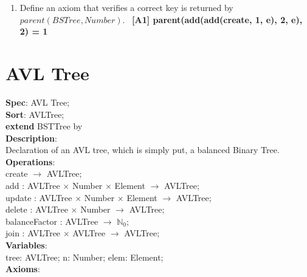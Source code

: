 \documentclass[12pt]{article}
\begin{document}
\begin{spacing}{1.5}
\begin{enumerate}
\item Define an axiom that verifies a correct key is returned by $parent(BSTree, Number)$.\
\hspace*{5mm} \textbf{[A1] parent(add(add(create, 1, e), 2, e), 2) = 1}
\

\end{enumerate}

\newpage

\section*{AVL Tree}

\noindent \textbf{Spec}: AVL Tree;\\
\noindent \textbf{Sort}: AVLTree;\\
\noindent \textbf{extend} BSTTree by\\
\noindent \textbf{Description}:\\Declaration of an AVL tree, which is simply put, a balanced Binary Tree.\\
\noindent \textbf{Operations}:\\
\hspace*{5mm} create $\rightarrow$ AVLTree;\\
\hspace*{5mm} add : AVLTree $\times$ Number $\times$ Element $\rightarrow$ AVLTree;\\
\hspace*{5mm} update : AVLTree $\times$ Number $\times$ Element $\rightarrow$ AVLTree;\\
\hspace*{5mm} delete : AVLTree $\times$ Number $\rightarrow$ AVLTree;\\
\hspace*{5mm} balanceFactor :  AVLTree $\rightarrow$ $\mathbb{N}_0$;\\
\hspace*{5mm} join : AVLTree $\times$ AVLTree $\rightarrow$ AVLTree;\\
\noindent \textbf{Variables}:\\
\hspace*{5mm} tree: AVLTree; n: Number; elem: Element;\\
\noindent \textbf{Axioms}:\\


\end{spacing}
\end{document}
